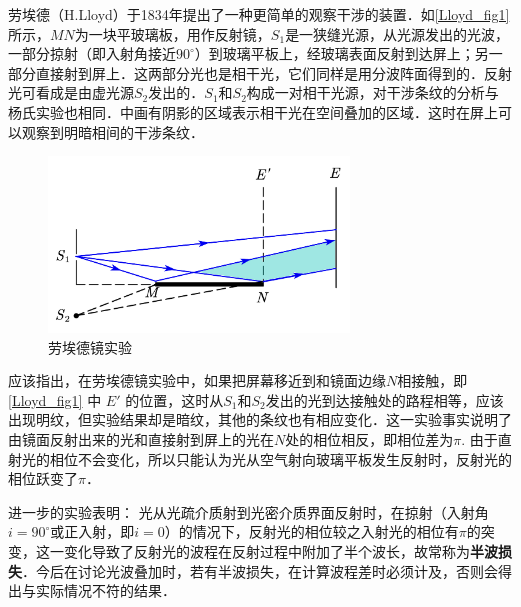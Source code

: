 

劳埃德（H.Lloyd）于1834年提出了一种更简单的观察干涉的装置．如\autoref{Lloyd_fig1} 所示，$MN $为一块平玻璃板，用作反射镜，$S_1$是一狭缝光源，从光源发出的光波，一部分掠射（即入射角接近$90^\circ$）到玻璃平板上，经玻璃表面反射到达屏上；另一部分直接射到屏上．这两部分光也是相干光，它们同样是用分波阵面得到的．反射光可看成是由虚光源$S_2 $发出的．$S_1$和$S_2 $构成一对相干光源，对干涉条纹的分析与杨氏实验也相同．中画有阴影的区域表示相干光在空间叠加的区域．这时在屏上可以观察到明暗相间的干涉条纹．
\begin{figure}[ht]
\centering
\includegraphics[width=8cm]{./figures/Lloyd_1.pdf}
\caption{劳埃德镜实验} \label{Lloyd_fig1}
\end{figure}
应该指出，在劳埃德镜实验中，如果把屏幕移近到和镜面边缘$N $相接触，即\autoref{Lloyd_fig1} 中 $E' $ 的位置，这时从$S_1$和$S_2$发出的光到达接触处的路程相等，应该出现明纹，但实验结果却是暗纹，其他的条纹也有相应变化．这一实验事实说明了由镜面反射出来的光和直接射到屏上的光在$N $处的相位相反，即相位差为$\pi$. 由于直射光的相位不会变化，所以只能认为光从空气射向玻璃平板发生反射时，反射光的相位跃变了$\pi$．

进一步的实验表明： 光从光疏介质射到光密介质界面反射时，在掠射（入射角$i=90^\circ$或正入射，即$i = 0$）的情况下，反射光的相位较之入射光的相位有$\pi$的突变，这一变化导致了反射光的波程在反射过程中附加了半个波长，故常称为\textbf{半波损失}．今后在讨论光波叠加时，若有半波损失，在计算波程差时必须计及，否则会得出与实际情况不符的结果．
